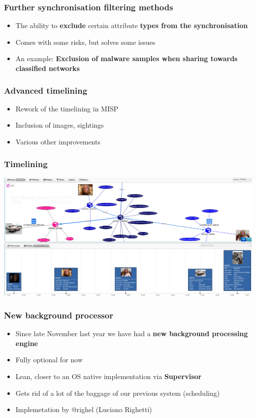 \begin{frame}
  \frametitle{Further synchronisation filtering methods}
  \begin{itemize}
     \item The ability to {\bf exclude} certain attribute {\bf types from the synchronisation}
     \item Comes with some risks, but solves some issues
     \item An example: {\bf Exclusion of malware samples when sharing towards classified networks}
  \end{itemize}
\end{frame}

\begin{frame}
  \frametitle{Advanced timelining}
  \begin{itemize}
     \item Rework of the timelining in MISP
     \item Inclusion of images, sightings
     \item Various other improvements
  \end{itemize}
\end{frame}

\begin{frame}
\frametitle{Timelining}
\includegraphics[scale=0.2]{images/timelining.png}
\end{frame}

\begin{frame}
  \frametitle{New background processor}
  \begin{itemize}
     \item Since late November last year we have had a {\bf new background processing engine}
     \item Fully optional for now
     \item Lean, closer to an OS native implementation via {\bf Supervisor}
     \item Gets rid of a lot of the baggage of our previous system (scheduling)
     \item Implemetation by @righel (Luciano Righetti)
  \end{itemize}
\end{frame}


